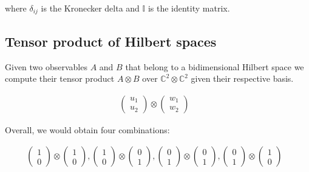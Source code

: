 \documentclass{Configuration_Files/PoliMi3i_thesis}
\begin{document}
where $ \delta_{ij} $ is the Kronecker delta and $\mathbb{I}$ is the identity matrix.


\subsection{Tensor product of Hilbert spaces}

Given two observables $A$ and $B$ that belong to a bidimensional Hilbert space we compute their tensor product $A \otimes B$ over $\mathbb{C}^2 \otimes \mathbb{C}^2$ given their respective basis.


\[
\begin{array}{ccc}
	\begin{pmatrix}
		u_1  \\
		u_2  
	\end{pmatrix} 
	\otimes
	\begin{pmatrix}
		w_1  \\
		w_2 
	\end{pmatrix} &
\end{array}
\]

Overall, we would obtain four combinations:

\[
\begin{array}{ccc}
	\begin{pmatrix}
		1 \\
		0  
	\end{pmatrix} 
	\otimes
	\begin{pmatrix}
		1  \\
		0 
	\end{pmatrix} ,
	
	\begin{pmatrix}
		1 \\
		0  
	\end{pmatrix} 
	\otimes
	\begin{pmatrix}
		0  \\
		1 
	\end{pmatrix} ,
	
	\begin{pmatrix}
		0 \\
		1  
	\end{pmatrix} 
	\otimes
	\begin{pmatrix}
		0  \\
		1 
	\end{pmatrix} ,
	
	\begin{pmatrix}
		0 \\
		1  
	\end{pmatrix} 
	\otimes
	\begin{pmatrix}
		1  \\
		0 
	\end{pmatrix} &
\end{array}
\]
\end{document}
